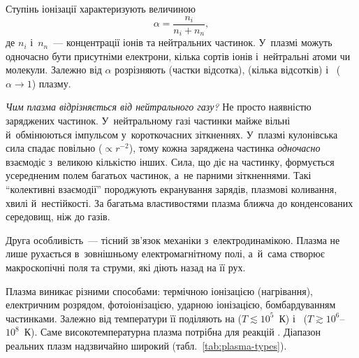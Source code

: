 Ступінь іонізації характеризують величиною
\begin{equation}\label{eq:ionization-degree}
	\alpha = \frac{n_i}{n_i + n_n},
\end{equation}
де $n_i$ і~$n_n$~--- концентрації іонів та нейтральних частинок. У~плазмі можуть одночасно
бути присутніми електрони, кілька сортів іонів і~нейтральні атоми чи молекули. Залежно від
$\alpha$ розрізняють  (частки відсотка),  (кілька відсотків) і~ ($\alpha\to1$) плазму.

\emph{Чим плазма відрізняється від нейтрального газу?} Не просто наявністю заряджених
частинок. У~нейтральному газі частинки майже вільні й~обмінюються імпульсом
у~короткочасних зіткненнях. У~плазмі кулонівська сила спадає повільно ($\propto r^{-2}$),
тому кожна заряджена частинка \emph{одночасно} взаємодіє з~великою кількістю інших. Сила,
що діє на частинку, формується усередненим полем багатьох частинок, а~не парними
зіткненнями. Такі \enquote{колективні взаємодії} породжують екранування зарядів, плазмові
коливання, хвилі й~нестійкості. За багатьма властивостями плазма ближча до конденсованих
середовищ, ніж до газів.

Друга особливість~--- тісний зв'язок механіки з~електродинамікою. Плазма не лише рухається
в~зовнішньому електромагнітному полі, а~й~сама створює макроскопічні поля та струми, які
діють назад на її рух.

Плазма виникає різними способами: термічною іонізацією (нагрівання), електричним розрядом,
фотоіонізацією, ударною іонізацією, бомбардуванням частинками. Залежно від температури її
поділяють на  ($T\lesssim10^5$~К) і~
($T\gtrsim10^6$--$10^8$~К). Саме високотемпературна плазма потрібна для реакцій
. Діапазон реальних плазм надзвичайно широкий
(табл.~\ref{tab:plasma-types}).

